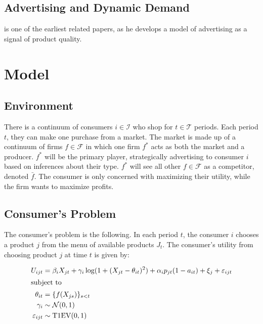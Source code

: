 \documentclass[12pt]{article}
\begin{document}
    \subsection{Advertising and Dynamic Demand}
    \citet{nelson_information_1970} is one of the earliest related papers, as he develops a model of advertising as a signal of product quality.

\section{Model}

    \subsection{Environment}
    There is a continuum of consumers $i\in\mathcal{I}$ who shop for $t\in\mathcal{T}$ periods. Each period $t$, they can make one purchase from a market. The market is made up of a continuum of firms $f\in\mathcal{F}$ in which one firm $f^*$ acts as both the market and a producer. $f^*$ will be the primary player, strategically advertising to consumer $i$ based on inferences about their type. $f^*$ will see all other $f\in\mathcal{F}$ as a competitor, denoted $\bar{f}$. The consumer is only concerned with maximizing their utility, while the firm wants to maximize profits.


    \subsection{Consumer's Problem}
    The consumer's problem is the following. In each period $t$, the consumer $i$ chooses a product $j$ from the menu of available products $J_t$. The consumer's utility from choosing product $j$ at time $t$ is given by:

    \begin{alignat*}{1}
        U_{ijt} &= \beta_i X_{jt} + \gamma_i \log(1 + (X_{jt} - \theta_{it})^2) 
                  + \alpha_i p_{jt}(1 - a_{it}) + \xi_j + \varepsilon_{ijt} \\
    \shortintertext{subject to}
        \theta_{it} &= \{f(X_{js})\}_{s < t} \\
        \gamma_i &\sim \mathcal{N}(0, 1)\\ \varepsilon_{ijt} &\sim \text{T1EV}(0,1)
    \end{alignat*}
\end{document}
